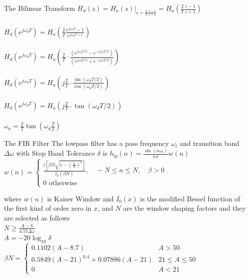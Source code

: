 \documentclass{beamer}
\begin{document}
\begin{frame}{The Bilinear Transform}
$H_{d}(z)=\left.H_{a}(s)\right|_{s=\frac{2}{T} \frac{z-1}{z+1}}=H_{a}\left(\frac{2}{T} \frac{z-1}{z+1}\right)$\\~\\

$H_{d}\left(e^{j \omega_{d} T}\right)=H_{a}\left(\frac{2}{T} \frac{e^{j \omega_{d} T}-1}{e^{j \omega_{d} T+1}}\right)$\\~\\

$H_{d}\left(e^{j \omega_{d} T}\right)=H_{a}\left(\frac{2}{T} \cdot \frac{\left(e^{j \omega_{d} T / 2}-e^{-j \omega_{d} T / 2}\right)}{\left(e^{j \omega_{d} T / 2}+e^{-j \omega_{d} T / 2}\right)}\right)$\\~\\

$H_{d}\left(e^{j \omega_{d} T}\right)=H_{a}\left(j \frac{2}{T} \cdot \frac{\sin \left(\omega_{d} T / 2\right)}{\cos \left(\omega_{d} T / 2\right)}\right)$\\~\\

$H_{d}\left(e^{j \omega_{d} T}\right)=H_{a}\left(j \frac{2}{T} \cdot \tan \left(\omega_{d} T / 2\right)\right)$\\~\\

$\omega_{a}=\frac{2}{T} \tan \left(\omega_{d} \frac{T}{2}\right)$
\end{frame}
\begin{frame}{The FIR Filter}
The lowpass filter has a pass frequency $\omega_{l}$ and transition band $\Delta \omega$ with Stop Band Tolerance $\delta$ is
$h_{l p}(n)=\frac{\sin \left(n \omega_{l}\right)}{n \pi} w(n)$
$w(n)=\left\{\begin{array}{l}\frac{l\left[\beta N \sqrt{1-\left(\frac{n}{N}\right)^{2}}\right]}{l_{0}(\beta N)}, \quad-N \leq n \leq N, \quad \beta>0 \\ 0 \text { otherwise }\end{array}\right.$

where $w(n)$ is Kaiser Window and $I_{0}(x)$ is the modified Bessel function of the first
kind of order zero in $x$, and $N$ are the window shaping factors and they are selected
as follows\\
$ N \geq \frac{A-8}{4.57 \Delta \omega} $\\
$ A=-20 \log _{10} \delta $\\

$\beta N=\left\{\begin{array}{ll}0.1102(A-8.7) & A>50 \\ 0.5849(A-21)^{0.4}+0.07886(A-21) & 21 \leq A \leq 50 \\ 0 & A<21\end{array}\right.$
\end{frame}
\end{document}
